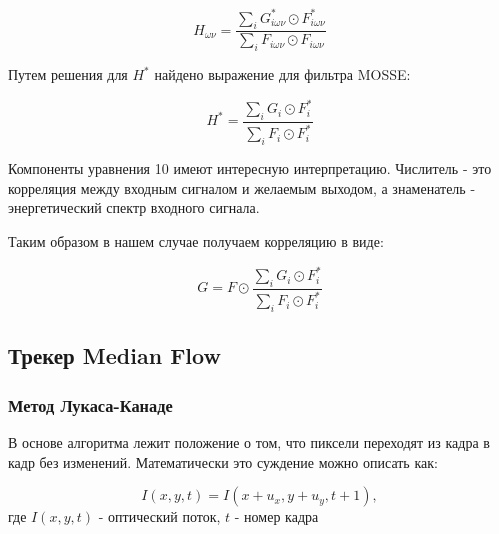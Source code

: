 \documentclass[a4paper,14pt]{extarticle}
\begin{document}
\begin{equation}
    H_{\omega\nu} = \frac{\sum_i G^*_{i\omega\nu} \odot F^*_{i\omega\nu}}{\sum_i F_{i\omega\nu} \odot F_{i\omega\nu}}
\end{equation}

Путем решения для $H^*$ найдено выражение для фильтра MOSSE:

\begin{equation}
    H^* = \frac{\sum_i G_i \odot F_i^*}{\sum_i F_i \odot F_i^*}
\end{equation}

Компоненты уравнения 10 имеют интересную интерпретацию. Числитель - это корреляция между входным сигналом и желаемым
выходом, а знаменатель - энергетический спектр
входного сигнала.

Таким образом в нашем случае получаем корреляцию в виде: 

\begin{equation}
    G = F \odot \frac{\sum_i G_i \odot F_i^*}{\sum_i F_i \odot F_i^*}
\end{equation}




\subsection{Трекер Median Flow}
\subsubsection{Метод Лукаса-Канаде}


В основе алгоритма лежит положение о том, что пиксели переходят из кадра в кадр без изменений. Математически это суждение можно описать как:

\begin{equation}
    I(x,y,t) = I(x+u_x,y+u_y,t+1),
\end{equation}
где $I(x,y,t)$ - оптический поток, $t$ - номер кадра
\end{document}
